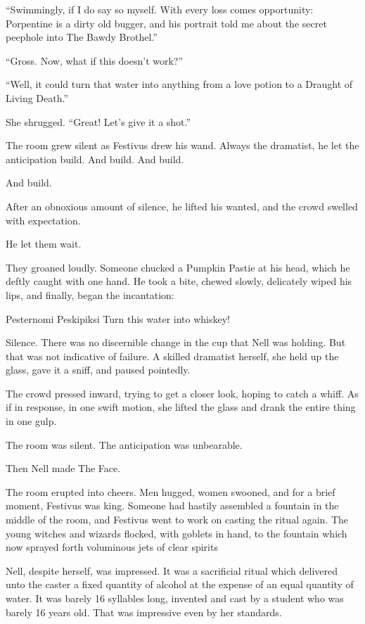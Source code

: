 “Swimmingly, if I do say so myself. With every loss comes opportunity: Porpentine is a dirty old bugger, and his portrait told me about the secret peephole into The Bawdy Brothel.”

“Gross. Now, what if this doesn’t work?”

“Well, it could turn that water into anything from a love potion to a Draught of Living Death.”

She shrugged. “Great! Let’s give it a shot.”

The room grew silent as Festivus drew his wand. Always the dramatist, he let the anticipation build. And build. And build.

And build.

After an obnoxious amount of silence, he lifted his wanted, and the crowd swelled with expectation.

He let them wait.

They groaned loudly. Someone chucked a Pumpkin Pastie at his head, which he deftly caught with one hand. He took a bite, chewed slowly, delicately wiped his lips, and finally, began the incantation:

Pesternomi Peskipiksi
Turn this water into whiskey!

Silence. There was no discernible change in the cup that Nell was holding. But that was not indicative of failure. A skilled dramatist herself, she held up the glass, gave it a sniff, and paused pointedly.

The crowd pressed inward, trying to get a closer look, hoping to catch a whiff. As if in response, in one swift motion, she lifted the glass and drank the entire thing in one gulp.

The room was silent. The anticipation was unbearable.

Then Nell made The Face.

The room erupted into cheers. Men hugged, women swooned, and for a brief moment, Festivus was king. Someone had hastily assembled a fountain in the middle of the room, and Festivus went to work on casting the ritual again. The young witches and wizards flocked, with goblets in hand, to the fountain which now sprayed forth voluminous jets of clear spirits

Nell, despite herself, was impressed. It was a sacrificial ritual which delivered unto the caster a fixed quantity of alcohol at the expense of an equal quantity of water. It was barely 16 syllables long, invented and cast by a student who was barely 16 years old. That was impressive even by her standards.

